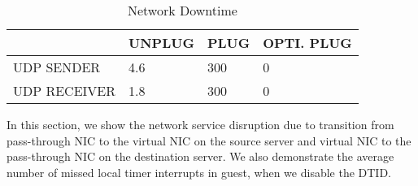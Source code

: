 


\begin{table}[tbp]
\begin{tabular}{|l|l|l|l|}
\hline
& UNPLUG & PLUG & OPTI. PLUG \\ \hline
UDP SENDER & 4.6 & 300 & 0 \\ \hline
UDP RECEIVER & 1.8 & 300 & 0 \\ \hline
\end{tabular}
\caption{Network Downtime}
\label{tab:migration_network_downtime}
\end{table}

In this section, we show the network service disruption
due to transition from pass-through NIC to the virtual NIC 
on the source server and virtual NIC to the pass-through
NIC on the destination server.
We also demonstrate the average 
number of missed local timer interrupts in guest, 
when we disable the DTID.


